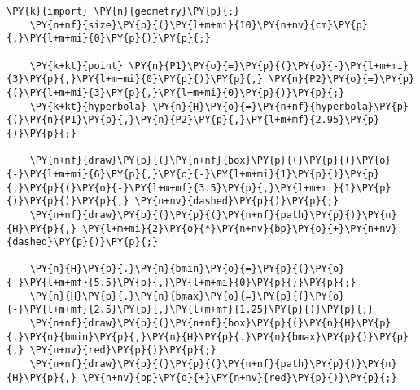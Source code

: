 \begin{Verbatim}[commandchars=\\\{\}]
    \PY{k}{import} \PY{n}{geometry}\PY{p}{;}
    \PY{n+nf}{size}\PY{p}{(}\PY{l+m+mi}{10}\PY{n+nv}{cm}\PY{p}{,}\PY{l+m+mi}{0}\PY{p}{)}\PY{p}{;}

    \PY{k+kt}{point} \PY{n}{P1}\PY{o}{=}\PY{p}{(}\PY{o}{-}\PY{l+m+mi}{3}\PY{p}{,}\PY{l+m+mi}{0}\PY{p}{)}\PY{p}{,} \PY{n}{P2}\PY{o}{=}\PY{p}{(}\PY{l+m+mi}{3}\PY{p}{,}\PY{l+m+mi}{0}\PY{p}{)}\PY{p}{;}
    \PY{k+kt}{hyperbola} \PY{n}{H}\PY{o}{=}\PY{n+nf}{hyperbola}\PY{p}{(}\PY{n}{P1}\PY{p}{,}\PY{n}{P2}\PY{p}{,}\PY{l+m+mf}{2.95}\PY{p}{)}\PY{p}{;}

    \PY{n+nf}{draw}\PY{p}{(}\PY{n+nf}{box}\PY{p}{(}\PY{p}{(}\PY{o}{-}\PY{l+m+mi}{6}\PY{p}{,}\PY{o}{-}\PY{l+m+mi}{1}\PY{p}{)}\PY{p}{,}\PY{p}{(}\PY{o}{-}\PY{l+m+mf}{3.5}\PY{p}{,}\PY{l+m+mi}{1}\PY{p}{)}\PY{p}{)}\PY{p}{,} \PY{n+nv}{dashed}\PY{p}{)}\PY{p}{;}
    \PY{n+nf}{draw}\PY{p}{(}\PY{p}{(}\PY{n+nf}{path}\PY{p}{)}\PY{n}{H}\PY{p}{,} \PY{l+m+mi}{2}\PY{o}{*}\PY{n+nv}{bp}\PY{o}{+}\PY{n+nv}{dashed}\PY{p}{)}\PY{p}{;}

    \PY{n}{H}\PY{p}{.}\PY{n}{bmin}\PY{o}{=}\PY{p}{(}\PY{o}{-}\PY{l+m+mf}{5.5}\PY{p}{,}\PY{l+m+mi}{0}\PY{p}{)}\PY{p}{;}
    \PY{n}{H}\PY{p}{.}\PY{n}{bmax}\PY{o}{=}\PY{p}{(}\PY{o}{-}\PY{l+m+mf}{2.5}\PY{p}{,}\PY{l+m+mf}{1.25}\PY{p}{)}\PY{p}{;}
    \PY{n+nf}{draw}\PY{p}{(}\PY{n+nf}{box}\PY{p}{(}\PY{n}{H}\PY{p}{.}\PY{n}{bmin}\PY{p}{,}\PY{n}{H}\PY{p}{.}\PY{n}{bmax}\PY{p}{)}\PY{p}{,} \PY{n+nv}{red}\PY{p}{)}\PY{p}{;}
    \PY{n+nf}{draw}\PY{p}{(}\PY{p}{(}\PY{n+nf}{path}\PY{p}{)}\PY{n}{H}\PY{p}{,} \PY{n+nv}{bp}\PY{o}{+}\PY{n+nv}{red}\PY{p}{)}\PY{p}{;}
\end{Verbatim}
